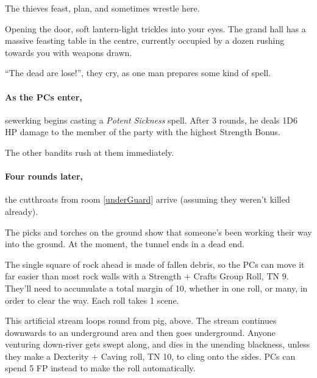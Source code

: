 \begin{multicols}{2}

The thieves feast, plan, and sometimes wrestle here.

\begin{boxtext}
  Opening the door, soft lantern-light trickles into your eyes.
  The grand hall has a massive feasting table in the centre, currently occupied by a dozen rushing towards you with weapons drawn.

  ``The dead are lose!'', they cry, as one man prepares some kind of spell.
\end{boxtext}

\paragraph{As the PCs enter,}
\gls{sewerking} begins casting a \textit{Potent Sickness} spell.
After 3 rounds, he deals 1D6 HP damage to the member of the party with the highest Strength Bonus.

The other bandits rush at them immediately.

\sewerking


\paragraph{Four rounds later,}
the cutthroats from room \ref{underGuard} arrive (assuming they weren't killed already).


\begin{boxtext}
  The picks and torches on the ground show that someone's been working their way into the ground.  At the moment, the tunnel ends in a dead end.
\end{boxtext}
 
The single square of rock ahead is made of fallen debris, so the PCs can move it far easier than most rock walls with a Strength + Crafts Group Roll, TN 9.%
\iftoggle{core}%
{\footnote{See the core rules, page \pageref{grouproll}, for Group Rolls.}}%
{}
They'll need to accumulate a total margin of 10, whether in one roll, or many, in order to clear the way.
Each roll takes 1 scene.

\label{slidein}

This artificial stream loops round from \gls{pig}, above.
The stream continues downwards to an underground area and then goes underground.
Anyone venturing down-river gets swept along, and dies in the unending blackness, unless they make a Dexterity + Caving roll, TN 10, to cling onto the sides.
PCs can spend 5 FP instead to make the roll automatically.


\end{multicols}
